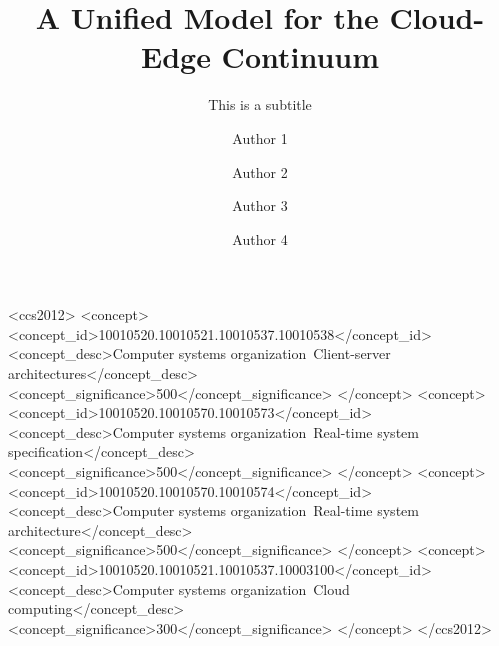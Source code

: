 \documentclass[manuscript, review, screen]{acmart}
\begin{document}
\title{A Unified Model for the Cloud-Edge Continuum} 
 \subtitle{This is a subtitle}

\author{Author 1}
\author{Author 2}
\author{Author 3}
\author{Author 4}

\renewcommand\shortauthors{Zhou, G. et al}

\begin{abstract}
%
\end{abstract}


%
%
\begin{CCSXML}
<ccs2012>
<concept>
<concept_id>10010520.10010521.10010537.10010538</concept_id>
<concept_desc>Computer systems organization~Client-server architectures</concept_desc>
<concept_significance>500</concept_significance>
</concept>
<concept>
<concept_id>10010520.10010570.10010573</concept_id>
<concept_desc>Computer systems organization~Real-time system specification</concept_desc>
<concept_significance>500</concept_significance>
</concept>
<concept>
<concept_id>10010520.10010570.10010574</concept_id>
<concept_desc>Computer systems organization~Real-time system architecture</concept_desc>
<concept_significance>500</concept_significance>
</concept>
<concept>
<concept_id>10010520.10010521.10010537.10003100</concept_id>
<concept_desc>Computer systems organization~Cloud computing</concept_desc>
<concept_significance>300</concept_significance>
</concept>
</ccs2012>
\end{CCSXML}
\end{document}
